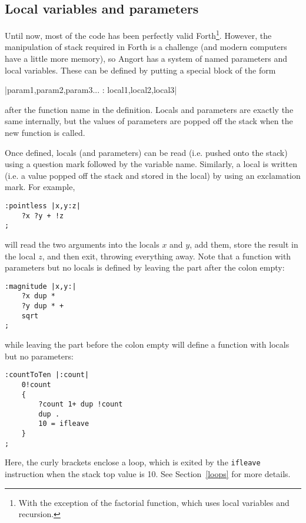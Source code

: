 \subsection{Local variables and parameters}
Until now, most of the code has been perfectly valid Forth\footnote{With
the exception of the factorial function, which uses local variables
and recursion.}. However, the manipulation of
stack required in Forth is a challenge (and modern computers
have a little more memory), so Angort has a system of named
parameters and local variables. These can be defined by
putting a special block of the form
\begin{v}
|param1,param2,param3... : local1,local2,local3|
\end{v}
after the function name in the definition. Locals and parameters are
exactly the same internally, but the values of parameters are popped
off the stack when the new function is called. 

Once defined, locals (and parameters) can be read (i.e. pushed onto
the stack) using a question mark followed by the variable name.
Similarly, a local is written (i.e. a value popped off the stack and
stored in the local) by using an exclamation mark. For example,
\begin{lstlisting}
:pointless |x,y:z|
    ?x ?y + !z
;
\end{lstlisting}
will read the two arguments into the locals $x$ and $y$, add them,
store the result in the local $z$, and then exit, throwing everything away.
Note that a function with parameters but no locals is defined by leaving
the part after the colon empty:
\begin{lstlisting}
:magnitude |x,y:|
    ?x dup *
    ?y dup * +
    sqrt
;
\end{lstlisting}
while leaving the part before the colon empty will define a function with
locals but no parameters:
\begin{lstlisting}
:countToTen |:count|
    0!count
    {
        ?count 1+ dup !count
        dup .
        10 = ifleave
    }
;
\end{lstlisting}
Here, the curly brackets enclose a loop, which is exited by the
\texttt{ifleave} instruction when the stack top value is 10. See
Section~\ref{loops} for more details.

